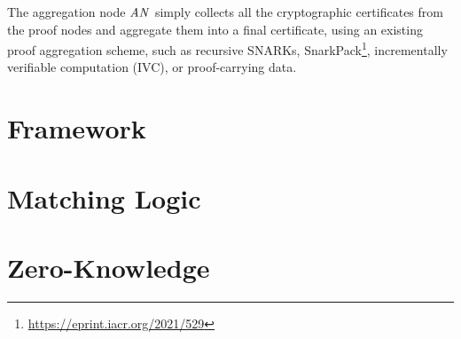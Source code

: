 \documentclass{article}
\begin{document}
The aggregation node $\mathit{AN}$ simply collects
all the cryptographic certificates from the proof nodes and aggregate them
into a final certificate, using an existing proof aggregation
scheme,  such as recursive SNARKs,
SnarkPack\footnote{\url{https://eprint.iacr.org/2021/529}},
incrementally verifiable computation (IVC),
or proof-carrying data. 

\appendix

\section{\K Framework}

\section{Matching Logic}

\section{Zero-Knowledge}
 
\end{document}
